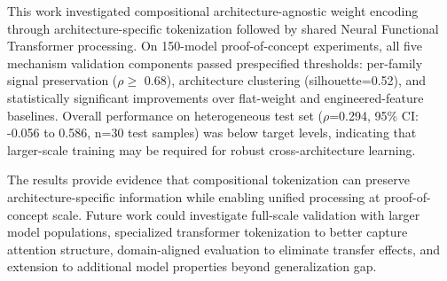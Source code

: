 
This work investigated compositional architecture-agnostic weight encoding through architecture-specific tokenization followed by shared Neural Functional Transformer processing. On 150-model proof-of-concept experiments, all five mechanism validation components passed prespecified thresholds: per-family signal preservation ($\rho \geq$ 0.68), architecture clustering (silhouette=0.52), and statistically significant improvements over flat-weight and engineered-feature baselines. Overall performance on heterogeneous test set ($\rho$=0.294, 95\% CI: -0.056 to 0.586, n=30 test samples) was below target levels, indicating that larger-scale training may be required for robust cross-architecture learning.

The results provide evidence that compositional tokenization can preserve architecture-specific information while enabling unified processing at proof-of-concept scale. Future work could investigate full-scale validation with larger model populations, specialized transformer tokenization to better capture attention structure, domain-aligned evaluation to eliminate transfer effects, and extension to additional model properties beyond generalization gap.
